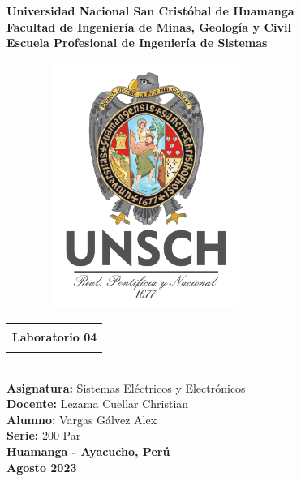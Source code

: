 \begin{titlepage}
	\begin{center}
		{\LARGE\textbf{Universidad Nacional San Cristóbal de Huamanga}}\\
		\vspace{0.5cm}
		{\LARGE\textbf{Facultad de Ingeniería de Minas, Geología y Civil}}\\
		\vspace{0.5cm}
		{\LARGE\textbf{Escuela Profesional de Ingeniería de Sistemas}}\\
		\vspace{1cm}
		\begin{figure}[h]
			\centering
			\includegraphics[width=7cm, height=8cm]{imagenes/logo}
		\end{figure}
		\vspace{0.75cm}
		\begin{tabular}{|c|}
			\hline
			\\
			{\Large\textbf{ Laboratorio 04  }}\\
			\\
			\hline
		\end{tabular}\\
		\vspace{0.75cm}
		{\Large\textbf{Asignatura: } Sistemas Eléctricos y Electrónicos}\\
		\vspace{0.75cm}
		{\Large\textbf{Docente: } Lezama Cuellar Christian}\\
		\vspace{0.75cm}
		{\Large\textbf{Alumno: }Vargas Gálvez Alex}\\
		\vspace{0.75cm}
		{\large\textbf{Serie: }200 Par}\\
		\vspace{ 1.5cm}
		{\huge \textbf{Huamanga - Ayacucho, Perú}}\\
		\vspace{1cm}
		{\huge \textbf{Agosto 2023}}
	\end{center}
\end{titlepage}